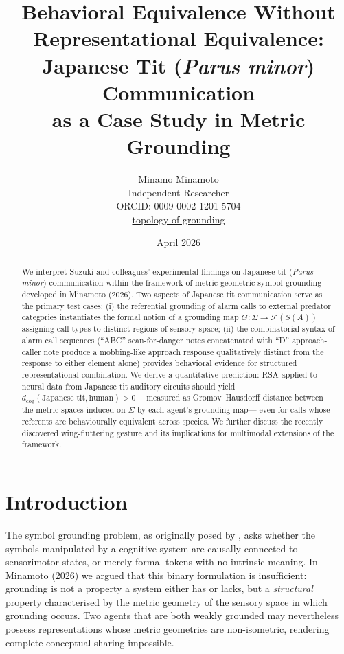 \documentclass[12pt]{article}
\title{Behavioral Equivalence Without Representational Equivalence:\\
Japanese Tit (\textit{Parus minor}) Communication\\
as a Case Study in Metric Grounding}
\author{Minamo Minamoto\\
\small Independent Researcher\\
\small ORCID: 0009-0002-1201-5704\\
\small \href{https://github.com/minamominamoto/topology-of-grounding}{topology-of-grounding}
}
\date{April 2026}
\begin{document}
\maketitle

\begin{abstract}
We interpret Suzuki and colleagues' experimental findings on Japanese tit
(\textit{Parus minor}) communication within the framework of metric-geometric
symbol grounding developed in Minamoto (2026).
Two aspects of Japanese tit communication serve as the primary test cases:
(i) the referential grounding of alarm calls to external predator categories
instantiates the formal notion of a grounding map
$G: \Sigma \to \mathcal{F}(S(A))$
assigning call types to distinct regions of sensory space;
(ii) the combinatorial syntax of alarm call sequences
(``ABC'' scan-for-danger notes concatenated with ``D'' approach-caller note
produce a mobbing-like approach response qualitatively distinct
from the response to either element alone)
provides behavioral evidence for structured representational combination.
We derive a quantitative prediction:
RSA \citep{kriegeskorte2008} applied to neural data
from Japanese tit auditory circuits should yield
$d_\mathrm{cog}(\text{Japanese tit}, \text{human}) > 0$---
measured as Gromov--Hausdorff distance between
the metric spaces induced on $\Sigma$ by each agent's grounding map---
even for calls whose referents are behaviourally equivalent across species.
We further discuss the recently discovered wing-fluttering gesture
and its implications for multimodal extensions of the framework.
\end{abstract}

\section{Introduction}

The symbol grounding problem, as originally posed by \citet{harnad1990},
asks whether the symbols manipulated by a cognitive system
are causally connected to sensorimotor states,
or merely formal tokens with no intrinsic meaning.
In Minamoto (2026) we argued that this binary formulation is insufficient:
grounding is not a property a system either has or lacks,
but a \emph{structural} property characterised by the metric geometry
of the sensory space in which grounding occurs.
Two agents that are both weakly grounded may nevertheless
possess representations whose metric geometries are non-isometric,
rendering complete conceptual sharing impossible.
\end{document}
